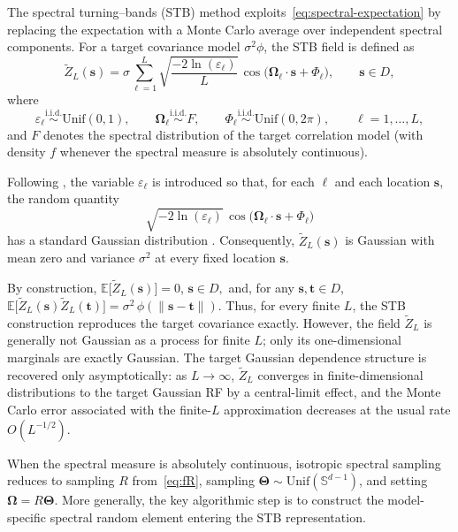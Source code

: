 \documentclass[
  12pt]{article}
\begin{document}
The spectral turning--bands (STB) method exploits~\eqref{eq:spectral-expectation} by replacing the expectation with a Monte Carlo average over independent spectral components.
For a target covariance model $\sigma^2\phi$, the STB field is defined as \citep{Lantu2002}
\begin{equation}\label{eq:TB-def-prob}
\widetilde Z_L(\mathbf{s})
=
\sigma \sum_{\ell=1}^L
\sqrt{\frac{-2\ln(\varepsilon_\ell)}{L}}\,
\cos\!\bigl(\boldsymbol{\Omega}_\ell\cdot\mathbf{s}+\Phi_\ell\bigr),
\qquad \mathbf{s}\in D,
\end{equation}
where
\[
\varepsilon_\ell \stackrel{\text{i.i.d.}}{\sim}\mathrm{Unif}(0,1),
\qquad
\boldsymbol{\Omega}_\ell \stackrel{\text{i.i.d.}}{\sim} F,
\qquad
\Phi_\ell \stackrel{\text{i.i.d.}}{\sim}\mathrm{Unif}(0,2\pi),
\qquad
\ell=1,\dots,L,
\]
and $F$ denotes the spectral distribution of the target correlation model (with density $f$ whenever the spectral measure is absolutely continuous).

Following \cite{AELL}, the variable $\varepsilon_\ell$ is introduced so that, for each $\ell$ and each location $\mathbf{s}$, the random quantity
\[
\sqrt{-2\ln(\varepsilon_\ell)}\,
\cos\!\bigl(\boldsymbol{\Omega}_\ell\cdot\mathbf{s}+\Phi_\ell\bigr)
\]
has a standard Gaussian distribution \citep{box:1958}.
Consequently, $\widetilde Z_L(\mathbf{s})$ is Gaussian with mean zero and variance $\sigma^2$ at every fixed location $\mathbf{s}$.

By construction,
$
\mathbb{E}\!\bigl[\widetilde Z_L(\mathbf{s})\bigr]=0$,
$\mathbf{s}\in D,$
and, for any $\mathbf{s},\mathbf{t}\in D$,
$
\mathbb{E}\!\bigl[\widetilde Z_L(\mathbf{s})\widetilde Z_L(\mathbf{t})\bigr]
=
\sigma^2\,\phi(\|\mathbf{s}-\mathbf{t}\|).
$
Thus, for every finite $L$, the STB construction reproduces the target covariance exactly.
However, the field $\widetilde Z_L$ is generally not Gaussian as a process for finite $L$; only its one-dimensional marginals are exactly Gaussian.
The target Gaussian dependence structure is recovered only asymptotically: as $L\to\infty$, $\widetilde Z_L$ converges in finite-dimensional distributions to the target Gaussian RF by a central-limit effect, and the Monte Carlo error associated with the finite-$L$ approximation decreases at the usual rate $O(L^{-1/2})$.

When the spectral measure is absolutely continuous, isotropic spectral sampling reduces to sampling $R$ from~\eqref{eq:fR}, sampling $\boldsymbol{\Theta}\sim\mathrm{Unif}(\mathbb{S}^{d-1})$, and setting $\boldsymbol{\Omega}=R\boldsymbol{\Theta}$.
More generally, the key algorithmic step is to construct the model-specific spectral random element entering the STB representation.
\end{document}
